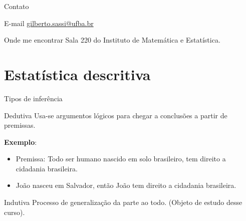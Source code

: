 \documentclass[9pt]{beamer}
\begin{document}
\begin{frame}{Contato}

  \begin{block}{E-mail}
   \href{mailto:gilberto.sassi@ufba.br}{gilberto.sassi@ufba.br}
 \end{block}

 \vfill
 
 \begin{block}{Onde me encontrar}
  Sala 220 do Instituto de Matemática e Estatística.
 \end{block}
\end{frame}

\section{Estatística descritiva}
\begin{frame}{Tipos de inferência}
 
 \vfill
 
 \begin{block}{Dedutiva}
  Usa-se argumentos lógicos para chegar a conclusões a partir de premissas.

  \textbf{Exemplo}: 
  \begin{itemize}
   \item Premissa: Todo ser humano nascido em solo brasileiro, tem direito a cidadania brasileira. 
   \item João nasceu em Salvador, então João tem direito a cidadania brasileira.
  \end{itemize}
 \end{block}

 \vfill
 
 \begin{block}{Indutiva}
  Processo de generalização da parte ao todo. (Objeto de estudo desse curso). 
  

\end{block}
\end{frame}
\end{document}
